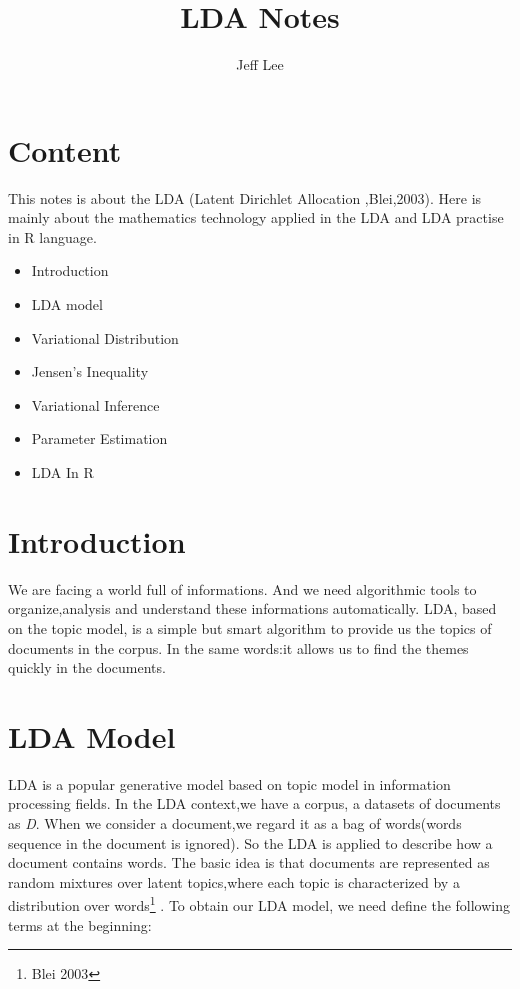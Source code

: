 \documentclass[12pt,a4paper]{article}
\begin{document}
\begin{CJK}{UTF8}{gbsn}%
\title{LDA Notes}
\author{Jeff Lee}
\maketitle

\section{Content}
This notes is about the LDA (Latent Dirichlet Allocation ,Blei,2003). Here is mainly about the mathematics technology applied in the LDA and LDA practise in R language.

\begin{itemize}
\item Introduction
\item LDA model
\item Variational Distribution
\item Jensen's Inequality
\item Variational Inference
\item Parameter Estimation
\item LDA In R
\end{itemize}

\section{Introduction}
We are facing a world full of informations. And we need algorithmic tools to organize,analysis and understand these informations automatically. LDA, based on the topic model, is a simple but smart algorithm to provide us the topics of documents in the corpus. In the same words:it allows us to find the themes quickly in the documents.

\section{LDA Model}
LDA is a popular generative model based on topic model in information processing fields. In the LDA context,we have a corpus, a datasets of  documents as \textit{D}. When we consider a document,we regard it as a bag of words(words sequence in the document is ignored). So the LDA is applied to describe how a document contains words. The basic idea is that documents are represented as random mixtures over latent topics,where each topic is characterized by a distribution over words\footnote{Blei 2003} . To obtain our LDA model, we need define the following terms at the beginning:


\end{CJK}
\end{document}
